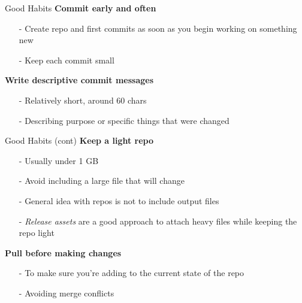 \documentclass[aspectratio=169]{beamer}
\begin{document}
\begin{frame}{Good Habits}\small
  \vspace{4ex}
  {\bf\darkgreen Commit early and often}
  \begin{itemize}
    \item[-] Create repo and first commits as soon as you begin working on
    something new\\[1ex]
    \item[-] Keep each commit small
    \\[1ex]
  \end{itemize}
  \vspace{6ex}
  {\bf\darkgreen Write descriptive commit messages}\\
  \begin{itemize}
    \item[-] Relatively short, around 60 chars
    \item[-] Describing purpose or specific things that were changed
  \end{itemize}
  \vspace{4ex}
\end{frame}


\begin{frame}{Good Habits (cont)}\small
  \vspace{4ex}
  {\bf\darkgreen Keep a light repo}\\
  \begin{itemize}
    \item[-] Usually under 1 GB
    \item[-] Avoid including a large file that will change
    \item[-] General idea with repos is not to include output files
    \item[-] {\it Release assets} are a good approach to attach heavy files while
    keeping the repo light
  \end{itemize}
  \vspace{6ex}
  {\bf\darkgreen Pull before making changes}\\
  \begin{itemize}
    \item[-] To make sure you're adding to the current state of the repo
    \item[-] Avoiding merge conflicts
  \end{itemize}
  \vspace{4ex}
\end{frame}
\end{document}
